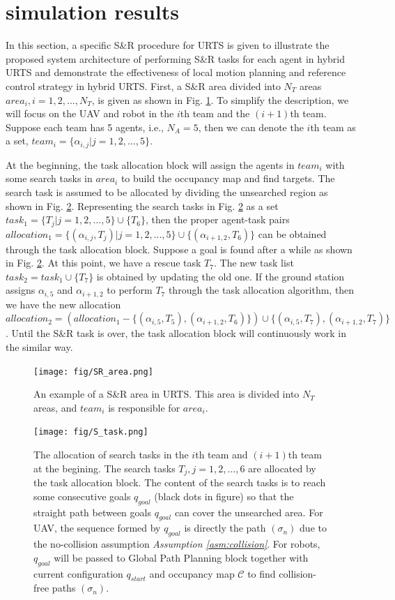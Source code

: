 \documentclass[journal,12pt,onecolumn,draftclsnofoot,]{IEEEtran}
\begin{document}
\section{simulation results}
In this section, a specific S\&R procedure for URTS is given to illustrate the proposed system architecture of performing S\&R tasks for each agent in hybrid URTS and demonstrate the effectiveness of local motion planning and reference control strategy in hybrid URTS. First, a S\&R area divided into $N_T$ areas $area_i,i=1,2,...,N_T$, is given as shown in Fig. \ref{fig:SR_area}. To simplify the description, we will focus on the UAV and robot in the $i$th team and the $(i+1)$th team. Suppose each team has 5 agents, i.e., $N_A=5$, then we can denote the $i$th team as a set, $team_i=\{ \alpha_{i,j} | j=1,2,...,5 \}$.

At the beginning, the task allocation block will assign the agents in $team_i$ with some search tasks in $area_i$ to build the occupancy map and find targets. The search task is assumed to be allocated by dividing the unsearched region as shown in Fig. \ref{fig:S_task}. Representing the search tasks in Fig. \ref{fig:S_task} as a set $task_1=\{ T_j | j=1,2,...,5 \}\cup\{T_6\}$, then the proper agent-task pairs $allocation_1=\{ (\alpha_{i,j},T_j) | j=1,2,...,5 \}\cup\{(\alpha_{i+1,2},T_6)\}$ can be obtained through the task allocation block. Suppose a goal is found after a while as shown in Fig. \ref{fig:S_task}. At this point, we have a rescue task $T_7$. The new task list $task_2=task_1\cup\{ T_7 \}$ is obtained by updating the old one. If the ground station assigns $\alpha_{i,5}$ and $\alpha_{i+1,2}$ to perform $T_7$ through the task allocation algorithm, then we have the new allocation $allocation_2=(allocation_1-\{ (\alpha_{i,5},T_5),(\alpha_{i+1,2},T_6) \})\cup\{ (\alpha_{i,5},T_7),(\alpha_{i+1,2},T_7) \}$. Until the S\&R task is over, the task allocation block will continuously work in the similar way.
\begin{figure}[htbp]
    \centering
    \texttt{[image: fig/SR\_area.png]}\caption{An example of a S\&R area in URTS. This area is divided into $N_T$ areas, and $team_i$ is responsible for $area_i$.}%
    \label{fig:SR_area}
\end{figure}
\begin{figure}[htbp]
    \centering
    \texttt{[image: fig/S\_task.png]}\caption{The allocation of search tasks in the $i$th team and $(i+1)$th team at the begining. The search tasks $T_j,j=1,2,...,6$ are allocated by the task allocation block. The content of the search tasks is to reach some consecutive goals $q_{goal}$ (black dots in figure) so that the straight path between goals $q_{goal}$ can cover the unsearched area. For UAV, the sequence formed by $q_{goal}$ is directly the path $(\sigma_n)$ due to the no-collision assumption \textit{Assumption \ref{asm:collision}}. For robots, $q_{goal}$ will be passed to Global Path Planning block together with current configuration $q_{start}$ and occupancy map $\mathcal{C}$ to find collision-free paths $(\sigma_n)$.}
    \label{fig:S_task}
\end{figure}
\end{document}
